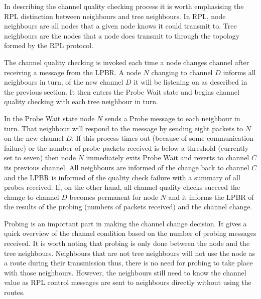 In describing the channel quality checking process it is worth emphasising the RPL distinction between neighbours and tree neighbours. In RPL, node neighbours are all nodes that a given node knows it could transmit to. Tree neighbours are the nodes that a node does transmit to through the topology formed by the RPL protocol.

The channel quality checking is invoked each time a node changes channel after receiving a message from the LPBR. A node $N$ changing to channel $D$ informs all neighbours in turn, of the new channel $D$ it will be listening on as described in the previous section. It then enters the Probe Wait state and begins channel quality checking with each tree neighbour in turn.  

In the Probe Wait state node $N$ sends a Probe message to each neighbour in turn. That neighbour will respond
to the message by sending eight packets to $N$ on the new channel $D$. If this process times out (because of some communication failure) or the number of probe packets received is below a threshold (currently set to
seven) then node $N$ immediately exits Probe Wait and reverts to channel $C$ its
previous channel. All neighbours are informed of the change back to channel $C$ and the LPBR is informed of
the quality check failure with a summary of all probes received.
If, on the other hand, all channel quality checks succeed the change to channel $D$ becomes permanent for node $N$ and it informs the LPBR of the results of the probing (numbers of packets received) and the channel change.

Probing is an important part in making the channel change decision. It gives a quick overview of the channel condition based on the number of probing messages received. It is worth noting that probing is only done between the node and the tree neighbours. Neighbours that are not tree neighbours will not use the node as a route during their transmission thus, there is no need for probing to take place with those neighbours. However, the neighbours still need to know the channel value as RPL control messages are sent to neighbours directly without using the routes.




